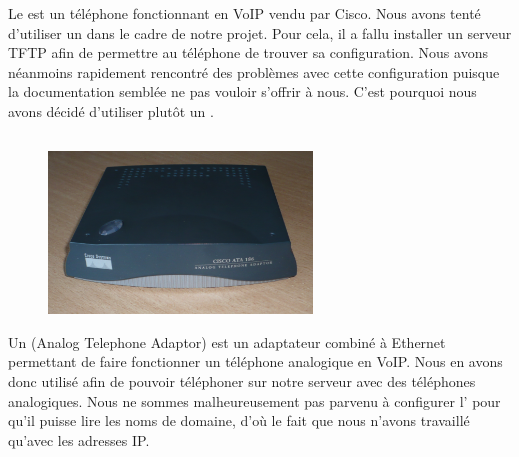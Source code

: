 Le {\cph} est un téléphone fonctionnant en VoIP vendu par Cisco. Nous avons tenté d'utiliser un {\cph} dans le cadre de notre projet. Pour cela, il a fallu installer un serveur TFTP afin de permettre au téléphone de trouver sa configuration.
Nous avons néanmoins rapidement rencontré des problèmes avec cette configuration puisque la documentation semblée ne pas vouloir s'offrir à nous.
C'est pourquoi nous avons décidé d'utiliser plutôt un {\ata}.

\subsection{\cata}

\begin{figure}[h]
\begin{center}
\includegraphics[width=7cm]{images/ata.jpg}
\end{center}
\caption{\ata}
\end{figure}

Un {\ata} (Analog Telephone Adaptor) est un adaptateur combiné à Ethernet permettant de faire fonctionner un téléphone analogique en VoIP. Nous en avons donc utilisé afin de pouvoir téléphoner sur notre serveur avec des téléphones analogiques. Nous ne sommes malheureusement pas parvenu à configurer l'{\ata} pour qu'il puisse lire les noms de domaine, d'où le fait que nous n'avons travaillé qu'avec les adresses IP.
